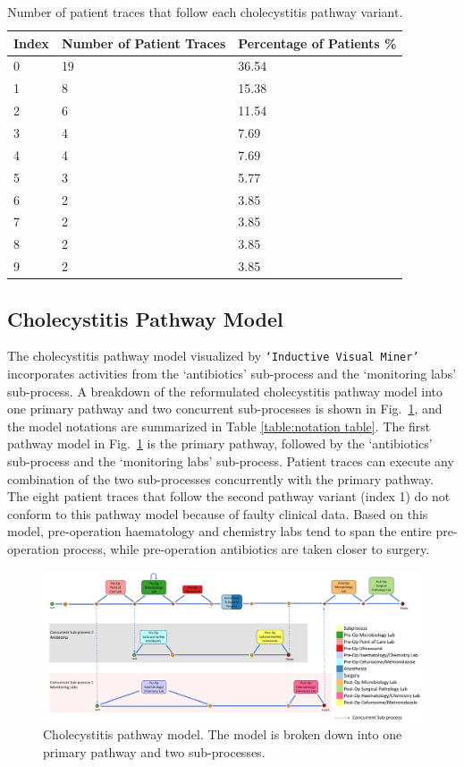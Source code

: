 \documentclass{elsarticle}
\begin{document}
\begin{table}[t]
\centering
\caption{Number of patient traces that follow each cholecystitis pathway variant.}
\label{table:cholecystitis variant table}
\begin{tabular}{ l l l }
 \hline
 Index & Number of Patient Traces & Percentage of Patients \% \\ 
 \hline
 0 & 19 & 36.54\\ 
 \hline
 1 & 8 & 15.38\\ 
 \hline
 2 & 6 & 11.54\\ 
 \hline
 3 & 4 & 7.69\\ 
 \hline
 4 & 4 & 7.69\\ 
 \hline
 5 & 3 & 5.77\\ 
 \hline
 6 & 2 & 3.85\\ 
 \hline
 7 & 2 & 3.85\\ 
 \hline
 8 & 2 & 3.85\\ 
 \hline
 9 & 2 & 3.85\\ 
 \hline
\end{tabular}
\end{table}

\subsection{Cholecystitis Pathway Model}
The cholecystitis pathway model visualized by \texttt{`Inductive Visual Miner'} incorporates activities from the `antibiotics' sub-process and the `monitoring labs' sub-process. A breakdown of the reformulated cholecystitis pathway model into one primary pathway and two concurrent sub-processes is shown in Fig.~\ref{fig:cholecystitis pathway model}, and the model notations are summarized in Table \ref{table:notation table}. The first pathway model in Fig.~\ref{fig:cholecystitis pathway model} is the primary pathway, followed by the `antibiotics’ sub-process and the `monitoring labs’ sub-process. Patient traces can execute any combination of the two sub-processes concurrently with the primary pathway. The eight patient traces that follow the second pathway variant (index 1) do not conform to this pathway model because of faulty clinical data. Based on this model, pre-operation haematology and chemistry labs tend to span the entire pre-operation process, while pre-operation antibiotics are taken closer to surgery.

\begin{figure}[t]
\centering
\includegraphics[width=18cm,angle=270]{images/communicative_cholecystitis_process_models_anes.jpg}
\caption{Cholecystitis pathway model. The model is broken down into one primary pathway and two sub-processes.}
\label{fig:cholecystitis pathway model}
\end{figure}
\end{document}
